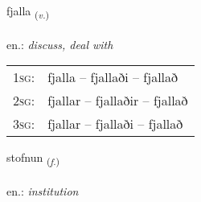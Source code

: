 \documentclass[frontgrid, backgrid]{flacards}\usepackage[]{graphicx}\usepackage[]{xcolor}
\begin{document}
\renewcommand{\blhead}{\vskip5pt {\small\bfseries\footnotesize Sagnorð | Verb }}
\renewcommand{\bcfoot}{\vskip5pt \hspace{2pt}{\small\bfseries\footnotesize 1K}}


{fjalla \small{\textsubscript{(\textit{v.})}} \\[1ex] %
\textphonetic{[fjatla]} \\
en.: \emph{discuss, deal with} \\  [2ex]
\renewcommand*{\arraystretch}{0.8}
\begin{tabular}{p{1cm}l}
\textsc{1sg}: & fjalla -- fjallaði -- fjallað \\ 
\textsc{2sg}: & fjallar -- fjallaðir -- fjallað \\ 
\textsc{3sg}: & fjallar -- fjallaði -- fjallað \\ 
\end{tabular}
}

\renewcommand{\flhead}{\vskip5pt \fboxsep=0pt {\small\bfseries\footnotesize Nafnorð | Noun}}
\renewcommand{\fcfoot}{\vskip5pt \fboxsep=0pt \hspace{2pt}{\small\bfseries\footnotesize 1K}}

\renewcommand{\blhead}{\vskip5pt {\small\bfseries\footnotesize Nafnorð | Noun }}
\renewcommand{\bcfoot}{\vskip5pt \hspace{2pt}{\small\bfseries\footnotesize 1K}}


{stofnun \small{\textsubscript{(\textit{f.})}} \\[1ex] %
\textphonetic{[stɔpnʏn]} \\
en.: \emph{institution} \\  [2ex]
\renewcommand*{\arraystretch}{0.8}
}
\end{document}
